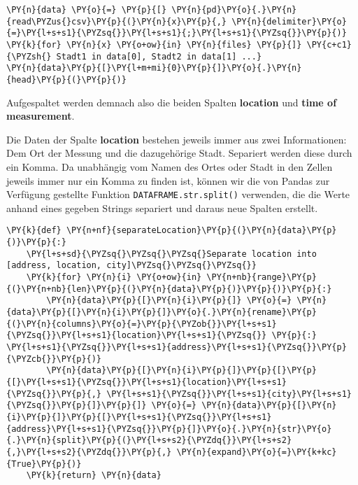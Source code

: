    \begin{tcolorbox}[breakable, size=fbox, boxrule=1pt, pad at break*=1mm,colback=cellbackground, colframe=cellborder]
\begin{Verbatim}[commandchars=\\\{\}]
\PY{n}{data} \PY{o}{=} \PY{p}{[} \PY{n}{pd}\PY{o}{.}\PY{n}{read\PYZus{}csv}\PY{p}{(}\PY{n}{x}\PY{p}{,} \PY{n}{delimiter}\PY{o}{=}\PY{l+s+s1}{\PYZsq{}}\PY{l+s+s1}{;}\PY{l+s+s1}{\PYZsq{}}\PY{p}{)} \PY{k}{for} \PY{n}{x} \PY{o+ow}{in} \PY{n}{files} \PY{p}{]} \PY{c+c1}{\PYZsh{} Stadt1 in data[0], Stadt2 in data[1] ...}
\PY{n}{data}\PY{p}{[}\PY{l+m+mi}{0}\PY{p}{]}\PY{o}{.}\PY{n}{head}\PY{p}{(}\PY{p}{)}
\end{Verbatim}
\end{tcolorbox}

    Aufgespaltet werden demnach also die beiden Spalten \textbf{location}
und \textbf{time of measurement}.

Die Daten der Spalte \textbf{location} bestehen jeweils immer aus zwei
Informationen: Dem Ort der Messung und die dazugehörige Stadt. Separiert
werden diese durch ein Komma. Da unabhängig vom Namen des Ortes oder
Stadt in den Zellen jeweils immer nur ein Komma zu finden ist, können
wir die von Pandas zur Verfügung gestellte Funktion
\texttt{DATAFRAME.str.split()} verwenden, die die Werte anhand eines
gegeben Strings separiert und daraus neue Spalten erstellt.

    \begin{tcolorbox}[breakable, size=fbox, boxrule=1pt, pad at break*=1mm,colback=cellbackground, colframe=cellborder]
\begin{Verbatim}[commandchars=\\\{\}]
\PY{k}{def} \PY{n+nf}{separateLocation}\PY{p}{(}\PY{n}{data}\PY{p}{)}\PY{p}{:}
    \PY{l+s+sd}{\PYZsq{}\PYZsq{}\PYZsq{}Separate location into [address, location, city]\PYZsq{}\PYZsq{}\PYZsq{}}
    \PY{k}{for} \PY{n}{i} \PY{o+ow}{in} \PY{n+nb}{range}\PY{p}{(}\PY{n+nb}{len}\PY{p}{(}\PY{n}{data}\PY{p}{)}\PY{p}{)}\PY{p}{:}
        \PY{n}{data}\PY{p}{[}\PY{n}{i}\PY{p}{]} \PY{o}{=} \PY{n}{data}\PY{p}{[}\PY{n}{i}\PY{p}{]}\PY{o}{.}\PY{n}{rename}\PY{p}{(}\PY{n}{columns}\PY{o}{=}\PY{p}{\PYZob{}}\PY{l+s+s1}{\PYZsq{}}\PY{l+s+s1}{location}\PY{l+s+s1}{\PYZsq{}} \PY{p}{:} \PY{l+s+s1}{\PYZsq{}}\PY{l+s+s1}{address}\PY{l+s+s1}{\PYZsq{}}\PY{p}{\PYZcb{}}\PY{p}{)}
        \PY{n}{data}\PY{p}{[}\PY{n}{i}\PY{p}{]}\PY{p}{[}\PY{p}{[}\PY{l+s+s1}{\PYZsq{}}\PY{l+s+s1}{location}\PY{l+s+s1}{\PYZsq{}}\PY{p}{,} \PY{l+s+s1}{\PYZsq{}}\PY{l+s+s1}{city}\PY{l+s+s1}{\PYZsq{}}\PY{p}{]}\PY{p}{]} \PY{o}{=} \PY{n}{data}\PY{p}{[}\PY{n}{i}\PY{p}{]}\PY{p}{[}\PY{l+s+s1}{\PYZsq{}}\PY{l+s+s1}{address}\PY{l+s+s1}{\PYZsq{}}\PY{p}{]}\PY{o}{.}\PY{n}{str}\PY{o}{.}\PY{n}{split}\PY{p}{(}\PY{l+s+s2}{\PYZdq{}}\PY{l+s+s2}{,}\PY{l+s+s2}{\PYZdq{}}\PY{p}{,} \PY{n}{expand}\PY{o}{=}\PY{k+kc}{True}\PY{p}{)}
    \PY{k}{return} \PY{n}{data}
\end{Verbatim}
\end{tcolorbox}

